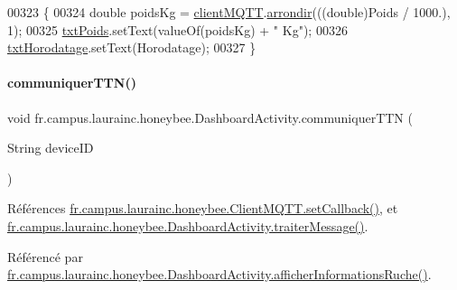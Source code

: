 \begin{DoxyCode}
00323     \{
00324         \textcolor{keywordtype}{double} poidsKg = \hyperlink{classfr_1_1campus_1_1laurainc_1_1honeybee_1_1_dashboard_activity_ac72bac3feefe69341b1785a0133e1de8}{clientMQTT}.\hyperlink{classfr_1_1campus_1_1laurainc_1_1honeybee_1_1_client_m_q_t_t_a00ce9a2b07615c9337e452b5a51fedbe}{arrondir}(((\textcolor{keywordtype}{double})Poids / 1000.), 1);
00325         \hyperlink{classfr_1_1campus_1_1laurainc_1_1honeybee_1_1_dashboard_activity_a1254223ab3507ce611d3244a43e8e14b}{txtPoids}.setText(valueOf(poidsKg) + \textcolor{stringliteral}{" Kg"});
00326         \hyperlink{classfr_1_1campus_1_1laurainc_1_1honeybee_1_1_dashboard_activity_a441403e9cd9a95a230d48b86090c4903}{txtHorodatage}.setText(Horodatage);
00327     \}
\end{DoxyCode}
\mbox{\label{classfr_1_1campus_1_1laurainc_1_1honeybee_1_1_dashboard_activity_abfefd572745e1034a025bc836812ae4f}} 
\paragraph{\texorpdfstring{communiquer\+T\+T\+N()}{communiquerTTN()}}
{\footnotesize\ttfamily void fr.\+campus.\+laurainc.\+honeybee.\+Dashboard\+Activity.\+communiquer\+T\+TN (\begin{DoxyParamCaption}\item[{String}]{device\+ID }\end{DoxyParamCaption})\hspace{0.3cm}{\ttfamily [private]}}



Références \hyperlink{classfr_1_1campus_1_1laurainc_1_1honeybee_1_1_client_m_q_t_t_ace2e0a1f888cb34e2a5a5c241eb6b94a}{fr.\+campus.\+laurainc.\+honeybee.\+Client\+M\+Q\+T\+T.\+set\+Callback()}, et \hyperlink{classfr_1_1campus_1_1laurainc_1_1honeybee_1_1_dashboard_activity_a50d4c14e993ff1779ae5dce8cee11216}{fr.\+campus.\+laurainc.\+honeybee.\+Dashboard\+Activity.\+traiter\+Message()}.



Référencé par \hyperlink{classfr_1_1campus_1_1laurainc_1_1honeybee_1_1_dashboard_activity_a88f00531bee33bd6c47b33f5ac4df9ed}{fr.\+campus.\+laurainc.\+honeybee.\+Dashboard\+Activity.\+afficher\+Informations\+Ruche()}.


